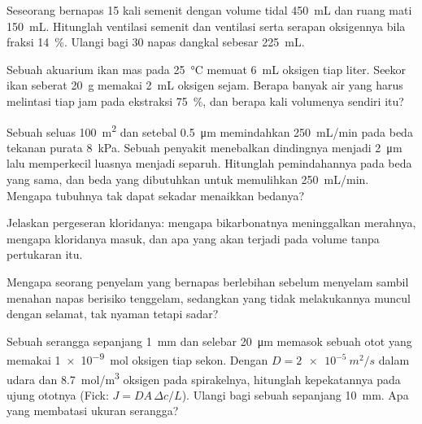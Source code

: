\begin{exercise}[$\star\star$]\label{exo:b1:gas-exchange:5}
Seseorang bernapas \qty{15}{} kali semenit dengan volume tidal
\qty{450}{mL} dan ruang mati \qty{150}{mL}. Hitunglah ventilasi semenit
dan ventilasi  serta serapan oksigennya bila fraksi
 \qty{14}{\%}. Ulangi bagi \qty{30}{} napas dangkal sebesar
\qty{225}{mL}.
\end{exercise}

\begin{exercise}[$\star\star$]\label{exo:b1:gas-exchange:6}
Sebuah akuarium ikan mas pada \qty{25}{\celsius} memuat \qty{6}{mL}
oksigen tiap liter. Seekor ikan seberat \qty{20}{g} memakai \qty{2}{mL}
oksigen sejam. Berapa banyak air yang harus melintasi  tiap
jam pada ekstraksi \qty{75}{\%}, dan berapa kali volumenya sendiri
itu?
\end{exercise}

\begin{exercise}[$\star\star$]\label{exo:b1:gas-exchange:7}
Sebuah  seluas \qty{100}{m^2} dan setebal \qty{0.5}{\micro m}
memindahkan \qty{250}{mL/min} pada beda tekanan purata \qty{8}{kPa}.
Sebuah penyakit menebalkan dindingnya menjadi \qty{2}{\micro m} lalu
memperkecil luasnya menjadi separuh. Hitunglah pemindahannya pada beda
yang sama, dan beda yang dibutuhkan untuk memulihkan \qty{250}{mL/min}.
Mengapa tubuhnya tak dapat sekadar menaikkan bedanya?
\end{exercise}

\begin{exercise}[$\star\star$]\label{exo:b1:gas-exchange:8}
Jelaskan pergeseran kloridanya: mengapa bikarbonatnya meninggalkan 
merahnya, mengapa kloridanya masuk, dan apa yang akan terjadi pada
volume  tanpa pertukaran itu.
\end{exercise}

\begin{exercise}[$\star\star$]\label{exo:b1:gas-exchange:9}
Mengapa seorang penyelam yang bernapas berlebihan sebelum menyelam
sambil menahan napas berisiko tenggelam, sedangkan yang tidak
melakukannya muncul dengan selamat, tak nyaman tetapi sadar?
\end{exercise}

\begin{exercise}[$\star\star\star$]\label{exo:b1:gas-exchange:10}
Sebuah  serangga sepanjang \qty{1}{mm} dan selebar
\qty{20}{\micro m} memasok sebuah otot yang memakai \qty{1e-9}{mol}
oksigen tiap sekon. Dengan $D = \qty{2e-5}{m^2/s}$ dalam udara dan
\qty{8.7}{mol/m^3} oksigen pada spirakelnya, hitunglah kepekatannya
pada ujung ototnya (Fick: $J = DA\,\Delta c/L$). Ulangi bagi sebuah
 sepanjang \qty{10}{mm}. Apa yang membatasi ukuran serangga?
\end{exercise}

